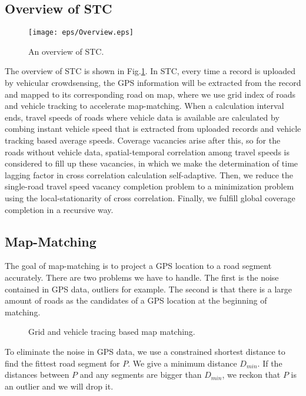 \documentclass[twocolumn,10pt,final,conference]{IEEEtran}
\begin{document}
\subsection{Overview of STC}\label{section-Overview}
\begin{figure}[h]
  \centering
\texttt{[image: eps/Overview.eps]}
\caption{An overview of STC.}
  \label{fig-Overview of architecture}

\end{figure}
The overview of STC is shown in Fig.\ref{fig-Overview of architecture}.
In STC, every time a record is uploaded by vehicular crowdsensing, the GPS information will be extracted from the record and mapped to its corresponding road on map, where we use grid index of roads and vehicle tracking to accelerate map-matching.
When a calculation interval ends, travel speeds of roads where vehicle data is available are calculated by combing instant vehicle speed that is extracted from uploaded records and vehicle tracking based average speeds. Coverage vacancies arise after this, so for the roads without vehicle data, spatial-temporal correlation among travel speeds is considered to fill up these vacancies, in which we make the determination of time lagging factor in cross correlation calculation self-adaptive. Then, we reduce the single-road travel speed vacancy completion problem to a minimization problem using the local-stationarity of cross correlation. Finally, we fulfill global coverage completion in a recursive way.
\subsection{ Map-Matching}\label{section-Map Matching}
The goal of map-matching is to project a GPS location to a road segment accurately. There are two problems we have to handle. The first is the noise contained in GPS data, outliers for example. The second is that there is a large amount of roads as the candidates of a GPS location at the beginning of matching.

\begin{figure}[h]
\centering
{}
\caption{Grid and vehicle tracing based map matching.}
\label{fig-Map Matching}
\end{figure}
To eliminate the noise in GPS data, we use a constrained shortest distance to find the fittest road segment for $P$. We give a minimum distance $D_{min}$. If the distances between $P$ and any segments are bigger than $D_{min}$, we reckon that $P$ is an outlier and we will drop it.
\end{document}
